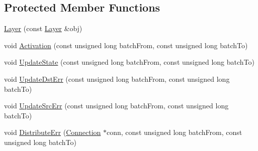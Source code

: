 \subsection*{Protected Member Functions}
\begin{DoxyCompactItemize}
\item 
\hyperlink{classfractal_1_1Layer_a199534e5328b9f8032e8fb5825c6af08}{Layer} (const \hyperlink{classfractal_1_1Layer}{Layer} \&obj)
\item 
void \hyperlink{classfractal_1_1Layer_a15ae052db7f8840740bb8f0eb61ac495}{Activation} (const unsigned long batch\+From, const unsigned long batch\+To)
\item 
void \hyperlink{classfractal_1_1Layer_a85bedac6dd991b7a01a3332f469e2675}{Update\+State} (const unsigned long batch\+From, const unsigned long batch\+To)
\item 
void \hyperlink{classfractal_1_1Layer_a0fe2f9c641f45e5214ff8606a12a3bbe}{Update\+Dst\+Err} (const unsigned long batch\+From, const unsigned long batch\+To)
\item 
void \hyperlink{classfractal_1_1Layer_a19537c998c460cdeae37f20d522540fa}{Update\+Src\+Err} (const unsigned long batch\+From, const unsigned long batch\+To)
\item 
void \hyperlink{classfractal_1_1Layer_a741bcadfe5821e3fc6a9a22bdd22e38a}{Distribute\+Err} (\hyperlink{classfractal_1_1Connection}{Connection} $\ast$conn, const unsigned long batch\+From, const unsigned long batch\+To)
\end{DoxyCompactItemize}
